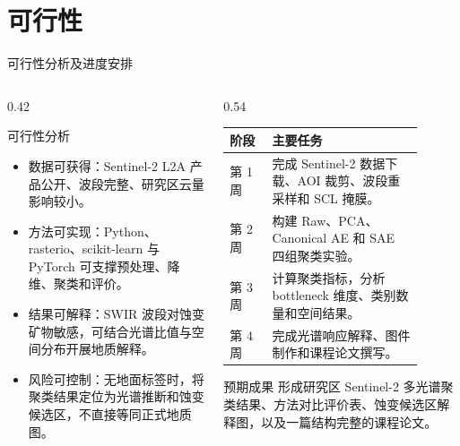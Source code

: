 \documentclass[10pt,aspectratio=169]{beamer}
\begin{document}
\section{可行性}
\begin{frame}{可行性分析及进度安排}
  \begin{columns}[T,onlytextwidth]
    \begin{column}{0.42\linewidth}
      \begin{block}{可行性分析}
        \begin{itemize}
          \item 数据可获得：Sentinel-2 L2A 产品公开、波段完整、研究区云量影响较小。
          \item 方法可实现：Python、rasterio、scikit-learn 与 PyTorch 可支撑预处理、降维、聚类和评价。
          \item 结果可解释：SWIR 波段对蚀变矿物敏感，可结合光谱比值与空间分布开展地质解释。
          \item 风险可控制：无地面标签时，将聚类结果定位为光谱推断和蚀变候选区，不直接等同正式地质图。
        \end{itemize}
      \end{block}
    \end{column}
    \begin{column}{0.54\linewidth}
      \scriptsize
      \begin{table}
        \centering
        \begin{tabular}{>{\raggedright\arraybackslash}p{0.18\linewidth}
                        >{\raggedright\arraybackslash}p{0.64\linewidth}}
          \toprule
          阶段 & 主要任务 \\
          \midrule
          第 1 周 & 完成 Sentinel-2 数据下载、AOI 裁剪、波段重采样和 SCL 掩膜。 \\
          第 2 周 & 构建 Raw、PCA、Canonical AE 和 SAE 四组聚类实验。 \\
          第 3 周 & 计算聚类指标，分析 bottleneck 维度、类别数量和空间结果。 \\
          第 4 周 & 完成光谱响应解释、图件制作和课程论文撰写。 \\
          \bottomrule
        \end{tabular}
      \end{table}
      \vspace{0.3em}
      \begin{block}{预期成果}
        \scriptsize
        形成研究区 Sentinel-2 多光谱聚类结果、方法对比评价表、蚀变候选区解释图，以及一篇结构完整的课程论文。
      \end{block}
    \end{column}
  \end{columns}
\end{frame}
\end{document}
